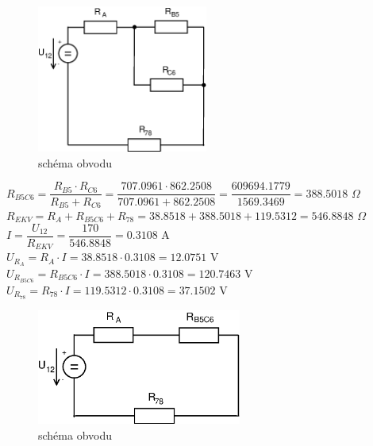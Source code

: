 \documentclass[10pt,a4paper]{article}
\begin{document}
  \begin{figure}[ht]
    \begin{center}
     \includegraphics[width=0.5\textwidth]{2020.eps}
      \caption{schéma obvodu}
    \end{center}
   \end{figure} 
   \newpage
  
  \begin{center}
     \begin{large}
      $ R_{B5C6} =\dfrac {R_{B5}\cdot R_{C6}}{R_{B5}+R_{C6}}= \dfrac{707.0961\cdot 862.2508}{707.0961+862.2508} = \dfrac{609694.1779}{1569.3469} = 388.5018 $ $\Omega$
      \\[6pt]
      $ R_{EKV} = R_A+R_{B5C6}+R_{78}= 38.8518 + 388.5018 +119.5312 = 546.8848 $ $\Omega$
      \\[6pt]
      $ I = \dfrac{U_{12}}{R_{EKV}} = \dfrac{170}{546.8848} = 0.3108 $ A 
      \\[6pt]
      $ U_{R_A} = R_A \cdot I = 38.8518 \cdot 0.3108 = 12.0751 $ V
      \\[6pt]
      $ U_{R_{B5C6}} = R_{B5C6} \cdot I = 388.5018 \cdot 0.3108 = 120.7463 $ V
      \\[6pt]
      $  U_{R_{78}} = R_{78} \cdot I = 119.5312 \cdot 0.3108 = 37.1502  $ V 
      \\[20pt]    
   \end{large}
  \end{center} 

  \begin{figure}[ht]
    \begin{center}
     \includegraphics[width=0.6\textwidth]{2021.eps}
      \caption{schéma obvodu}
    \end{center}
   \end{figure}  
\end{document}
